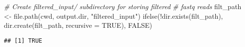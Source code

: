 \documentclass[
]{article}
\newenvironment{Shaded}{\begin{snugshade}}{\end{snugshade}}
\newcommand{\AttributeTok}[1]{\textcolor[rgb]{0.77,0.63,0.00}{#1}}
\newcommand{\CommentTok}[1]{\textcolor[rgb]{0.56,0.35,0.01}{\textit{#1}}}
\newcommand{\ConstantTok}[1]{\textcolor[rgb]{0.00,0.00,0.00}{#1}}
\newcommand{\FunctionTok}[1]{\textcolor[rgb]{0.00,0.00,0.00}{#1}}
\newcommand{\NormalTok}[1]{#1}
\newcommand{\OtherTok}[1]{\textcolor[rgb]{0.56,0.35,0.01}{#1}}
\newcommand{\SpecialCharTok}[1]{\textcolor[rgb]{0.00,0.00,0.00}{#1}}
\newcommand{\StringTok}[1]{\textcolor[rgb]{0.31,0.60,0.02}{#1}}
\begin{document}
\begin{Shaded}
\begin{Highlighting}[]
\CommentTok{\# Create filtered\_input/ subdirectory for storing filtered}
\CommentTok{\# fastq reads}
\NormalTok{filt\_path }\OtherTok{\textless{}{-}} \FunctionTok{file.path}\NormalTok{(cwd, output.dir, }\StringTok{"filtered\_input"}\NormalTok{)}
\FunctionTok{ifelse}\NormalTok{(}\SpecialCharTok{!}\FunctionTok{dir.exists}\NormalTok{(filt\_path), }\FunctionTok{dir.create}\NormalTok{(filt\_path, }\AttributeTok{recursive =} \ConstantTok{TRUE}\NormalTok{), }
    \ConstantTok{FALSE}\NormalTok{)}
\end{Highlighting}
\end{Shaded}

\begin{verbatim}
## [1] TRUE
\end{verbatim}
\end{document}
